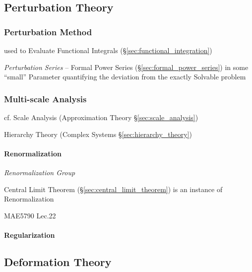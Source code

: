 \subsection{Perturbation Theory}\label{sec:perturbation_theory}

\subsubsection{Perturbation Method}\label{sec:perturbation_method}

used to Evaluate Functional Integrals (\S\ref{sec:functional_integration})

\emph{Perturbation Series} -- Formal Power Series
(\S\ref{sec:formal_power_series}) in some ``small'' Parameter quantifying the
deviation from the exactly Solvable problem



\subsubsection{Multi-scale Analysis}\label{sec:multiscale_analysis}

cf. Scale Analysis (Approximation Theory \S\ref{sec:scale_analysis})

\fist Hierarchy Theory (Complex Systems \S\ref{sec:hierarchy_theory})



\paragraph{Renormalization}\label{sec:renormalization}\hfill

\emph{Renormalization Group}

\fist Central Limit Theorem (\S\ref{sec:central_limit_theorem}) is an instance
of Renormalization

MAE5790 Lec.22



\paragraph{Regularization}\label{sec:regularization}\hfill



\subsection{Deformation Theory}\label{sec:deformation_theory}

